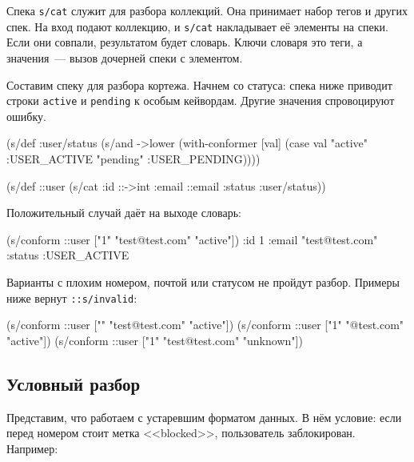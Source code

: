 
Спека \verb|s/cat| служит для разбора коллекций. Она принимает набор тегов и
других спек. На вход подают коллекцию, и \verb|s/cat| накладывает её
элементы на спеки. Если они совпали, результатом будет словарь. Ключи словаря
это теги, а значения~--- вызов дочерней спеки с элементом.

Составим спеку для разбора кортежа. Начнем со статуса: спека ниже приводит
строки \verb|active| и \verb|pending| к особым кейвордам. Другие значения
спровоцируют ошибку.

\begin{english}
  \begin{clojure}
(s/def :user/status
  (s/and ->lower
         (with-conformer [val]
           (case val
             "active"  :USER_ACTIVE
             "pending" :USER_PENDING))))

(s/def ::user
  (s/cat :id ::->int
         :email ::email
         :status :user/status))
  \end{clojure}
\end{english}

\noindent
Положительный случай даёт на выходе словарь:

\begin{english}
  \begin{clojure}
(s/conform ::user ["1" "test@test.com" "active"])
{:id 1
 :email "test@test.com"
 :status :USER_ACTIVE}
  \end{clojure}
\end{english}

Варианты с плохим номером, почтой или статусом не пройдут разбор. Примеры ниже
вернут \verb|::s/invalid|:

\begin{english}
  \begin{clojure}
(s/conform ::user ["" "test@test.com" "active"])
(s/conform ::user ["1" "@test.com" "active"])
(s/conform ::user ["1" "test@test.com" "unknown"])
  \end{clojure}
\end{english}

\subsection{Условный разбор}

Представим, что работаем с устаревшим форматом данных. В нём условие: если
перед номером стоит метка <<blocked>>, пользователь заблокирован. Например:

